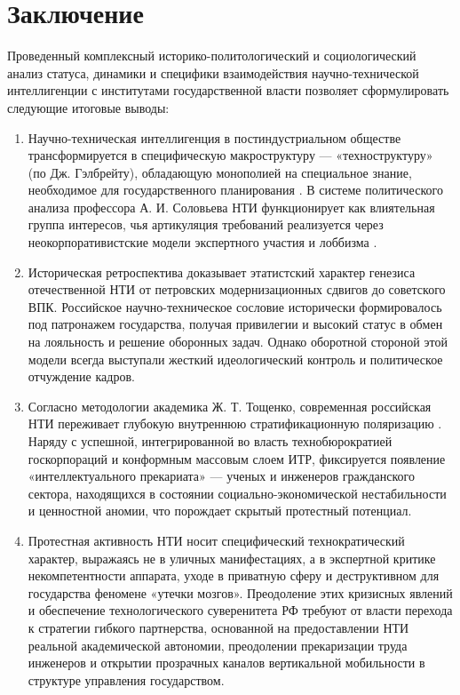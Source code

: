 \section*{Заключение}

Проведенный комплексный историко-политологический и социологический анализ статуса, динамики и специфики взаимодействия научно-технической интеллигенции с институтами государственной власти позволяет сформулировать следующие итоговые выводы:

\begin{enumerate}
    \item Научно-техническая интеллигенция в постиндустриальном обществе трансформируется в специфическую макроструктуру --- «техноструктуру» (по Дж. Гэлбрейту), обладающую монополией на специальное знание, необходимое для государственного планирования \cite{Gelbreyt}. В системе политического анализа профессора А. И. Соловьева НТИ функционирует как влиятельная группа интересов, чья артикуляция требований реализуется через неокорпоративистские модели экспертного участия и лоббизма \cite{Solovyev}.
    \item Историческая ретроспектива доказывает этатистский характер генезиса отечественной НТИ от петровских модернизационных сдвигов до советского ВПК. Российское научно-техническое сословие исторически формировалось под патронажем государства, получая привилегии и высокий статус в обмен на лояльность и решение оборонных задач. Однако оборотной стороной этой модели всегда выступали жесткий идеологический контроль и политическое отчуждение кадров.
    \item Согласно методологии академика Ж. Т. Тощенко, современная российская НТИ переживает глубокую внутреннюю стратификационную поляризацию \cite{Toschenko}. Наряду с успешной, интегрированной во власть технобюрократией госкорпораций и конформным массовым слоем ИТР, фиксируется появление «интеллектуального прекариата» --- ученых и инженеров гражданского сектора, находящихся в состоянии социально-экономической нестабильности и ценностной аномии, что порождает скрытый протестный потенциал.
    \item Протестная активность НТИ носит специфический технократический характер, выражаясь не в уличных манифестациях, а в экспертной критике некомпетентности аппарата, уходе в приватную сферу и деструктивном для государства феномене «утечки мозгов». Преодоление этих кризисных явлений и обеспечение технологического суверенитета РФ требуют от власти перехода к стратегии гибкого партнерства, основанной на предоставлении НТИ реальной академической автономии, преодолении прекаризации труда инженеров и открытии прозрачных каналов вертикальной мобильности в структуре управления государством.
\end{enumerate}